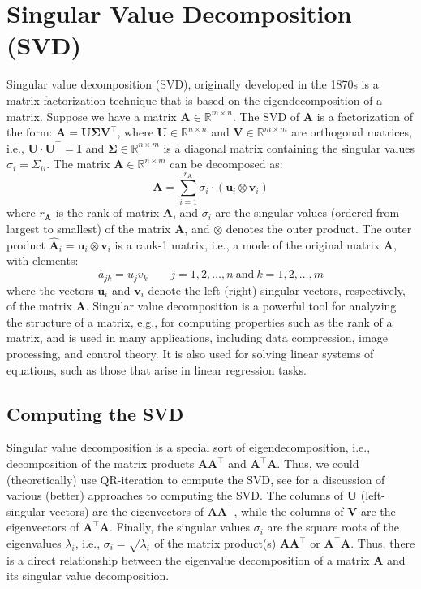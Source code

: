 \documentclass{article}[11pt]
\def\R{\mathbb{R}}
\begin{document}
\section{Singular Value Decomposition (SVD)}
Singular value decomposition (SVD), originally developed in the 1870s \citep{Stewart:1993} is a matrix factorization technique that is based on the eigendecomposition of a matrix.
Suppose we have a matrix $\mathbf{A} \in \R^{m \times n}$. The SVD of $\mathbf{A}$ is a factorization of the form: $\mathbf{A} = \mathbf{U}\mathbf{\Sigma}\mathbf{V}^{\top}$, where
$\mathbf{U}\in\mathbb{R}^{n\times{n}}$ and $\mathbf{V}\in\mathbb{R}^{m\times{m}}$ are orthogonal matrices, i.e., $\mathbf{U}\cdot\mathbf{U}^{\top} = \mathbf{I}$ and $\mathbf{\Sigma}\in\mathbb{R}^{n\times{m}}$ is a diagonal matrix containing 
the singular values $\sigma_{i}=\Sigma_{ii}$. The matrix $\mathbf{A}\in\mathbb{R}^{n\times{m}}$ can be decomposed as:
\begin{equation}
\mathbf{A} = \sum_{i=1}^{r_{\mathbf{A}}}\sigma_{i}\cdot\left(\mathbf{u}_{i}\otimes\mathbf{v}_{i}\right)
\end{equation}
where $r_{\mathbf{A}}$ is the rank of matrix $\mathbf{A}$, and $\sigma_{i}$ are the singular values (ordered from largest to smallest) of the matrix $\mathbf{A}$,
and $\otimes$ denotes the outer product. 
The outer product $\hat{\mathbf{A}}_{i} = \mathbf{u}_{i}\otimes\mathbf{v}_{i}$ is a rank-1 matrix, i.e., a mode of the original matrix $\mathbf{A}$,  with elements: 
\begin{equation}
\hat{a}_{jk} = u_{j}v_{k}\qquad{j=1,2,\dots,n~\text{and}~k=1,2,\dots,m}
\end{equation}
where the vectors $\mathbf{u}_{i}$ and $\mathbf{v}_{i}$ denote the left (right) singular vectors, respectively, of the matrix $\mathbf{A}$.
Singular value decomposition is a powerful tool for analyzing the structure of a matrix, e.g., for computing properties such as the rank of a matrix, and is used in many applications, 
including data compression, image processing, and control theory. It is also used for solving linear systems of equations,
such as those that arise in linear regression tasks.

\subsection{Computing the SVD}
Singular value decomposition is a special sort of eigendecomposition, i.e., decomposition of the matrix products $\mathbf{A}\mathbf{A}^{\top}$ and $\mathbf{A}^{\top}\mathbf{A}$.
Thus, we could (theoretically) use QR-iteration to compute the SVD, see \citep{Cline2006ComputationOT} for a discussion of various (better) approaches to computing the SVD.
The columns of $\mathbf{U}$ (left-singular vectors) are the eigenvectors of $\mathbf{A}\mathbf{A}^{\top}$, 
while the columns of $\mathbf{V}$ are the eigenvectors of $\mathbf{A}^{\top}\mathbf{A}$.
Finally, the singular values $\sigma_{i}$ are the square roots of the eigenvalues $\lambda_{i}$, i.e., $\sigma_{i} = \sqrt{\lambda_{i}}$ of the matrix product(s) $\mathbf{A}\mathbf{A}^{\top}$ or $\mathbf{A}^{\top}\mathbf{A}$. 
Thus, there is a direct relationship between the eigenvalue decomposition of a matrix $\mathbf{A}$ and its singular value decomposition.
\end{document}
